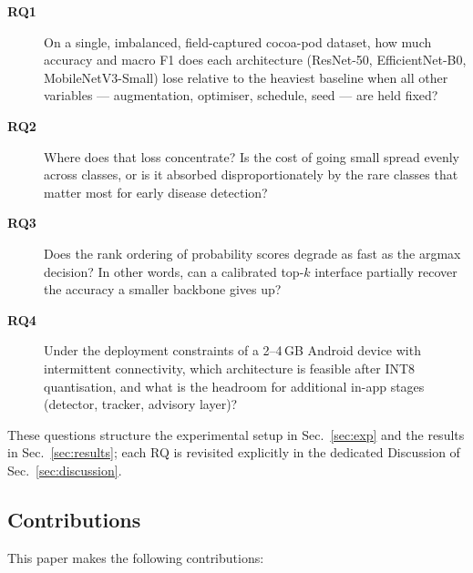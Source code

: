 \documentclass[conference,10pt]{IEEEtran}
\begin{document}
\begin{description}
\item[\textbf{RQ1}] On a single, imbalanced, field-captured cocoa-pod dataset,
how much accuracy and macro F1 does each architecture (ResNet-50,
EfficientNet-B0, MobileNetV3-Small) lose relative to the heaviest baseline
when all other variables — augmentation, optimiser, schedule, seed — are held
fixed?

\item[\textbf{RQ2}] Where does that loss concentrate? Is the cost of going
small spread evenly across classes, or is it absorbed disproportionately by
the rare classes that matter most for early disease detection?

\item[\textbf{RQ3}] Does the rank ordering of probability scores degrade as
fast as the argmax decision? In other words, can a calibrated top-$k$
interface partially recover the accuracy a smaller backbone gives up?

\item[\textbf{RQ4}] Under the deployment constraints of a 2--4\,GB Android
device with intermittent connectivity, which architecture is feasible after
INT8 quantisation, and what is the headroom for additional in-app stages
(detector, tracker, advisory layer)?
\end{description}

These questions structure the experimental setup in Sec.~\ref{sec:exp} and
the results in Sec.~\ref{sec:results}; each RQ is revisited explicitly in the
dedicated Discussion of Sec.~\ref{sec:discussion}.

\subsection{Contributions}

This paper makes the following contributions:
\end{document}
